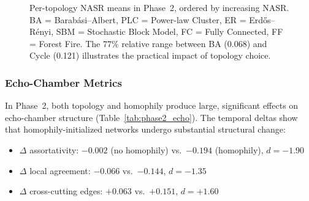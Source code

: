 \documentclass[11pt]{article}
\begin{document}
\begin{figure}[t]
\centering
{}
\caption{Per-topology NASR means in Phase~2, ordered by increasing NASR. BA = Barab\'{a}si--Albert, PLC = Power-law Cluster, ER = Erd\H{o}s--R\'{e}nyi, SBM = Stochastic Block Model, FC = Fully Connected, FF = Forest Fire. The 77\% relative range between BA (0.068) and Cycle (0.121) illustrates the practical impact of topology choice.}
\label{fig:nasr_topology}
\end{figure}

\subsubsection{Echo-Chamber Metrics}
\label{sec:phase2_echo}

In Phase~2, both topology and homophily produce large, significant effects on echo-chamber structure (Table~\ref{tab:phase2_echo}). The temporal deltas show that homophily-initialized networks undergo substantial structural change:

\begin{itemize}
    \item $\Delta$ assortativity: $-0.002$ (no homophily) vs.\ $-0.194$ (homophily), $d = -1.90$
    \item $\Delta$ local agreement: $-0.066$ vs.\ $-0.144$, $d = -1.35$
    \item $\Delta$ cross-cutting edges: $+0.063$ vs.\ $+0.151$, $d = +1.60$
\end{itemize}
\end{document}
